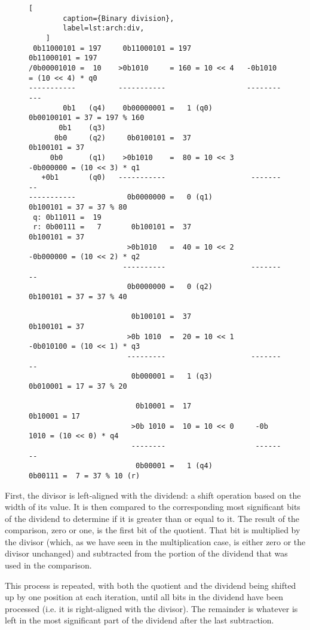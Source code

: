 \begin{figure}[ht]
    \begin{lstlisting}[
        caption={Binary division},
        label=lst:arch:div,
    ]
 0b11000101 = 197     0b11000101 = 197              0b11000101 = 197
/0b00001010 =  10    >0b1010     = 160 = 10 << 4   -0b1010     = (10 << 4) * q0
-----------          -----------                   -----------
        0b1   (q4)    0b00000001 =   1 (q0)         0b00100101 = 37 = 197 % 160
       0b1    (q3)
      0b0     (q2)     0b0100101 =  37               0b100101 = 37
     0b0      (q1)    >0b1010    =  80 = 10 << 3    -0b000000 = (10 << 3) * q1
   +0b1       (q0)   -----------                    ---------
-----------            0b0000000 =   0 (q1)          0b100101 = 37 = 37 % 80
 q: 0b11011 =  19
 r: 0b00111 =   7       0b100101 =  37               0b100101 = 37
                       >0b1010   =  40 = 10 << 2    -0b000000 = (10 << 2) * q2
                      ----------                    ---------
                       0b0000000 =   0 (q2)          0b100101 = 37 = 37 % 40

                        0b100101 =  37               0b100101 = 37
                       >0b 1010  =  20 = 10 << 1    -0b010100 = (10 << 1) * q3
                       ---------                    ---------
                        0b000001 =   1 (q3)          0b010001 = 17 = 37 % 20

                         0b10001 =  17                0b10001 = 17
                        >0b 1010 =  10 = 10 << 0     -0b 1010 = (10 << 0) * q4
                        --------                     --------
                         0b00001 =   1 (q4)           0b00111 =  7 = 37 % 10 (r)
    \end{lstlisting}
\end{figure}

First, the divisor is left-aligned with the dividend: a shift operation based on
the width of its value.  It is then compared to the corresponding most
significant bits of the dividend to determine if it is greater than or equal to
it.  The result of the comparison, zero or one, is the first bit of the
quotient.  That bit is multiplied by the divisor (which, as we have seen in the
multiplication case, is either zero or the divisor unchanged) and subtracted
from the portion of the dividend that was used in the comparison.

This process is repeated, with both the quotient and the dividend being shifted
up by one position at each iteration, until all bits in the dividend have been
processed (i.e. it is right-aligned with the divisor).  The remainder is
whatever is left in the most significant part of the dividend after the last
subtraction.

